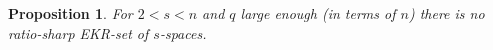 \documentclass[11pt]{article}
\newtheorem{prop}[thm]{Proposition}
\newcommand{\Gauss}[2]{{\begin{bmatrix} #1 \\ #2 \end{bmatrix}_q}}
\newcommand{\philipp}[1]{\textcolor{blue}{#1}}
\renewcommand{\leq}{\leqslant}
\renewcommand{\geq}{\geqslant}
\begin{document}

\begin{prop} \label{P: finish proof}
   For $2<s<n$ and $q$ large enough (in terms of $n$) there is no ratio-sharp EKR-set of $s$-spaces.
\end{prop}
\end{document}
